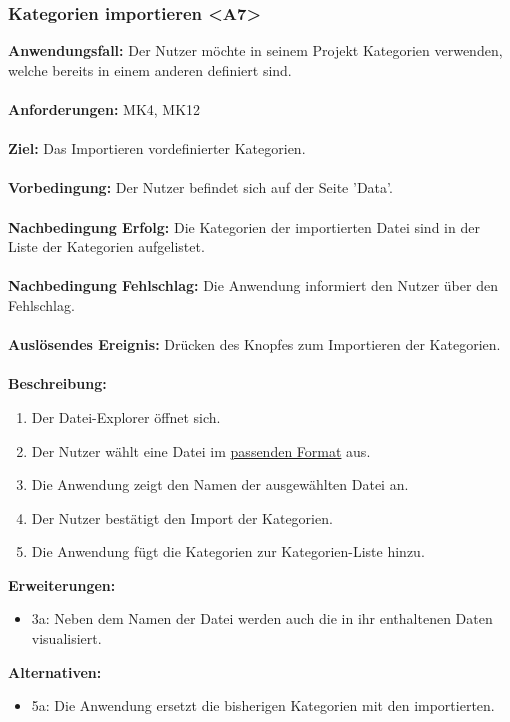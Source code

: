 \documentclass[parskip=full]{scrartcl} %
\begin{document}
\subsubsection*{Kategorien importieren <A7>}
\textbf{Anwendungsfall:} Der Nutzer möchte in seinem Projekt Kategorien verwenden, welche bereits in einem anderen definiert sind.\\\\
\textbf{Anforderungen:} MK4, MK12\\\\
\textbf{Ziel:} Das Importieren vordefinierter Kategorien. \\\\
\textbf{Vorbedingung:} Der Nutzer befindet sich auf der Seite 'Data'. \\\\
\textbf{Nachbedingung Erfolg:} Die Kategorien der importierten Datei sind in der Liste der Kategorien aufgelistet. \\\\
\textbf{Nachbedingung Fehlschlag:} Die Anwendung informiert den Nutzer über den Fehlschlag. \\\\
\textbf{Auslösendes Ereignis:} Drücken des Knopfes zum Importieren der Kategorien.\\\\
\textbf{Beschreibung:}
\begin{enumerate}
    \item Der Datei-Explorer öffnet sich.
    \item Der Nutzer wählt eine Datei im \hyperlink{dataformat}{passenden Format} aus.
    \item Die Anwendung zeigt den Namen der ausgewählten Datei an.
    \item Der Nutzer bestätigt den Import der Kategorien.
    \item Die Anwendung fügt die Kategorien zur Kategorien-Liste hinzu.
\end{enumerate}
\textbf{Erweiterungen:} 
\begin{itemize}
    \item 3a: Neben dem Namen der Datei werden auch die in ihr enthaltenen Daten visualisiert.
\end{itemize}
\textbf{Alternativen:} 
\begin{itemize}
    \item 5a: Die Anwendung ersetzt die bisherigen Kategorien mit den importierten.
\end{itemize}
\newpage
\end{document}
